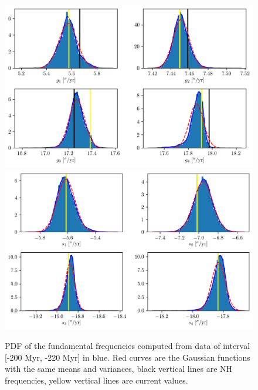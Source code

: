 \documentclass[12pt]{article}
\begin{document}
	
	\begin{figure}
		\centering
		\includegraphics[scale=0.85,center]{figures/PDF_g_210g}
		\includegraphics[scale=0.85,center]{figures/PDF_s_210g}    
		\caption{PDF of the fundamental frequencies computed from data of interval [-200 Myr, -220 Myr] in blue. Red curves are the Gaussian functions with the same means and variances, black vertical lines are NH frequencies, yellow vertical lines are current values.}
		\label{fig:past}
	\end{figure}
	
\end{document}
